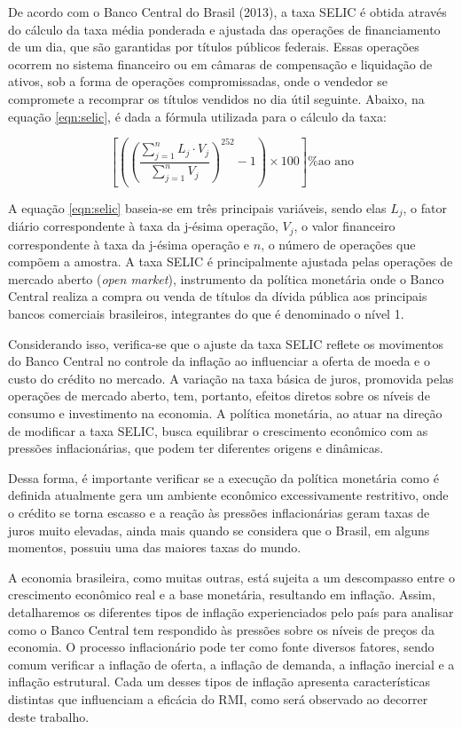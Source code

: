 \documentclass[12pt,oneside,a4paper,chapter=TITLE,english,brazil,sumario=abnt-6027-2012]{abntex2}
\begin{document}
De acordo com o Banco Central do Brasil (2013), a taxa SELIC é obtida através do cálculo da taxa média ponderada e ajustada das operações de financiamento de um dia, que são garantidas por títulos públicos federais. Essas operações ocorrem no sistema financeiro ou em câmaras de compensação e liquidação de ativos, sob a forma de operações compromissadas, onde o vendedor se compromete a recomprar os títulos vendidos no dia útil seguinte. Abaixo, na equação \ref{eqn:selic}, é dada a fórmula utilizada para o cálculo da taxa:

\begin{equation}
	\label{eqn:selic}
	\left[ \left( \left(\frac{\sum_{j=1}^{n} L_j \cdot V_j}{\sum_{j=1}^{n} V_j} \right)^{252} - 1 \right) \times 100 \right] \textrm{\% ao ano}
\end{equation}

A equação \ref{eqn:selic} baseia-se em três principais variáveis, sendo elas $L_j$, o fator diário correspondente à taxa da j-ésima operação, $V_j$, o valor financeiro correspondente à taxa da j-ésima operação e $n$, o número de operações que compõem a amostra. A taxa SELIC é principalmente ajustada pelas operações de mercado aberto (\textit{open market}), instrumento da política monetária onde o Banco Central realiza a compra ou venda de títulos da dívida pública aos principais bancos comerciais brasileiros, integrantes do que é denominado o nível 1.

Considerando isso, verifica-se que o ajuste da taxa SELIC reflete os movimentos do Banco Central no controle da inflação ao influenciar a oferta de moeda e o custo do crédito no mercado. A variação na taxa básica de juros, promovida pelas operações de mercado aberto, tem, portanto, efeitos diretos sobre os níveis de consumo e investimento na economia. A política monetária, ao atuar na direção de modificar a taxa SELIC, busca equilibrar o crescimento econômico com as pressões inflacionárias, que podem ter diferentes origens e dinâmicas.

Dessa forma, é importante verificar se a execução da política monetária como é definida atualmente gera um ambiente econômico excessivamente restritivo, onde o crédito se torna escasso e a reação às pressões inflacionárias geram taxas de juros muito elevadas, ainda mais quando se considera que o Brasil, em alguns momentos, possuiu uma das maiores taxas do mundo.

 A economia brasileira, como muitas outras, está sujeita a um descompasso entre o crescimento econômico real e a base monetária, resultando em inflação. Assim, detalharemos os diferentes tipos de inflação experienciados pelo país para analisar como o Banco Central tem respondido às pressões sobre os níveis de preços da economia. O processo inflacionário pode ter como fonte diversos fatores, sendo comum verificar a inflação de oferta, a inflação de demanda, a inflação inercial e a inflação estrutural. Cada um desses tipos de inflação apresenta características distintas que influenciam a eficácia do RMI, como será observado ao decorrer deste trabalho.
\end{document}
